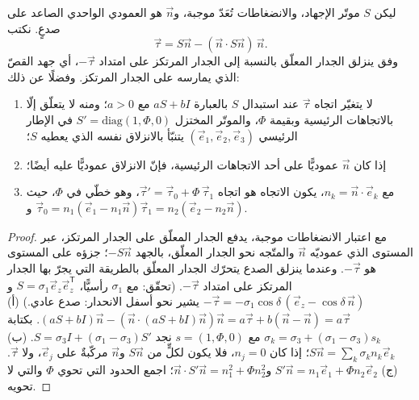 \begin{theorem}\label{thm:b3:structural-analysis:wallace-bott}
ليكن $S$ موتّر الإجهاد، والانضغاطات تُعَدّ موجبة، و$\vec n$ هو
العمودي الواحدي الصاعد على صدعٍ. نكتب
\[
  \vec\tau = S\vec n - (\vec n\cdot S\vec n)\,\vec n .
\]
وفق  ينزلق الجدار المعلّق بالنسبة إلى
الجدار المرتكز على امتداد $-\vec\tau$، أي جهد القصّ الذي يمارسه
على الجدار المرتكز. وفضلًا عن ذلك:
\begin{enumerate}[label=(\alph*)]
  \item لا يتغيّر اتجاه $\vec\tau$ عند استبدال $S$ بالعبارة $aS +
        bI$ مع $a > 0$؛ ومنه لا يتعلّق إلّا بالاتجاهات الرئيسية
        وبقيمة $\Phi$، والموتّر المختزل $S' =
        \mathrm{diag}(1, \Phi, 0)$ في الإطار الرئيسي $(\vec e_1, \vec
        e_2, \vec e_3)$ يتنبّأ بالانزلاق نفسه الذي يعطيه $S$؛
  \item إذا كان $\vec n$ عموديًّا على أحد الاتجاهات الرئيسية، فإنّ الانزلاق
        عموديًّا عليه أيضًا؛
  \item مع $n_k = \vec n\cdot\vec e_k$، يكون الاتجاه هو اتجاه $\vec\tau'
        = \vec\tau_0 + \Phi\,\vec\tau_1$، وهو خطّي في $\Phi$، حيث $\vec\tau_0
        = n_1(\vec e_1 - n_1\vec n)$ و$\vec\tau_1 = n_2(\vec e_2 - n_2\vec
        n)$.
\end{enumerate}
\end{theorem}

\begin{proof}
مع اعتبار الانضغاطات موجبة، يدفع الجدار المعلّق على الجدار المرتكز، عبر
المستوى الذي عموديّه $\vec n$ والمتّجه نحو الجدار المعلّق، بالجهد
$-S\vec n$؛ جزؤه على المستوى هو $-\vec\tau$. وعندما
ينزلق الصدع يتحرّك الجدار المعلّق بالطريقة التي يجرّ بها الجدار المرتكز على امتداد
$-\vec\tau$. (تحقّق: مع $\sigma_1$ رأسيًّا، $S = \sigma_1\vec e_z\vec
e_z^{\mathsf T}$ و$-\vec\tau = -\sigma_1\cos\delta\,(\vec e_z -
\cos\delta\,\vec n)$ يشير نحو أسفل الانحدار: صدع عادي.)
(أ) $(aS + bI)\vec n - (\vec n\cdot(aS + bI)\vec n)\vec n = a\vec\tau + b(\vec
n - \vec n) = a\vec\tau$. بكتابة $\sigma_k = \sigma_3 + (\sigma_1 -
\sigma_3)s_k$ مع $s = (1, \Phi, 0)$ نجد $S = \sigma_3 I + (\sigma_1 -
\sigma_3)S'$.
(ب) $S\vec n = \sum_k\sigma_kn_k\vec e_k$؛ إذا كان $n_j = 0$، فلا يكون لكلٍّ من $S\vec n$
و$\vec n$ مركّبةٌ على $\vec e_j$، ولا $\vec\tau$.
(ج) $S'\vec n = n_1\vec e_1 + \Phi n_2\vec e_2$ و$\vec n\cdot S'\vec n =
n_1^2 + \Phi n_2^2$؛ اجمع الحدود التي تحوي $\Phi$ والتي لا تحويه.
\end{proof}

